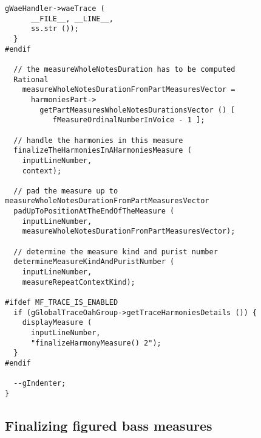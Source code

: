 \begin{lstlisting}[language=CPlusPlus]
    gWaeHandler->waeTrace (
      __FILE__, __LINE__,
      ss.str ());
  }
#endif

  // the measureWholeNotesDuration has to be computed
  Rational
    measureWholeNotesDurationFromPartMeasuresVector =
      harmoniesPart->
        getPartMeasuresWholeNotesDurationsVector () [
           fMeasureOrdinalNumberInVoice - 1 ];

  // handle the harmonies in this measure
  finalizeTheHarmoniesInAHarmoniesMeasure (
    inputLineNumber,
    context);

  // pad the measure up to measureWholeNotesDurationFromPartMeasuresVector
  padUpToPositionAtTheEndOfTheMeasure (
    inputLineNumber,
    measureWholeNotesDurationFromPartMeasuresVector);

  // determine the measure kind and purist number
  determineMeasureKindAndPuristNumber (
    inputLineNumber,
    measureRepeatContextKind);

#ifdef MF_TRACE_IS_ENABLED
  if (gGlobalTraceOahGroup->getTraceHarmoniesDetails ()) {
    displayMeasure (
      inputLineNumber,
      "finalizeHarmonyMeasure() 2");
  }
#endif

  --gIndenter;
}
\end{lstlisting}


\subsection{Finalizing figured bass measures}

